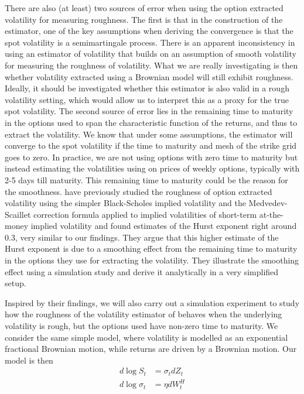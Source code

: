 \documentclass[fleqn,11pt,letterpaper]{article}
\theoremstyle{plain}
\theoremstyle{definition}
\theoremstyle{remark}
\numberwithin{equation}{section}
\begin{document}
There are also (at least) two sources of error when using the option extracted volatility for measuring roughness. The first is that in the construction of the estimator, one of the key assumptions when deriving the convergence is that the spot volatility is a semimartingale process. There is an apparent inconsistency in using an estimator of volatility that builds on an assumption of smooth volatility for measuring the roughness of volatility. What we are really investigating is then whether volatility extracted using a Brownian model will still exhibit roughness. Ideally, it should be investigated whether this estimator is also valid in a rough volatility setting, which would allow us to interpret this as a proxy for the true spot volatility. The second source of error lies in the remaining time to maturity in the options used to span the characteristic function of the returns, and thus to extract the volatility. We know that under some assumptions, the estimator will converge to the spot volatility if the time to maturity and mesh of the strike grid goes to zero. In practice, we are not using options with zero time to maturity but instead estimating the volatilities using on prices of weekly options, typically with 2-5 days till maturity. This remaining time to maturity could be the reason for the smoothness. \cite{LivieriEtAl2018} have previously studied the roughness of option extracted volatility using the simpler Black-Scholes implied volatility and the Medvedev-Scaillet correction formula applied to implied volatilities of short-term at-the-money implied volatility \citep{Medvedev2011} and found estimates of the Hurst exponent right around $0.3$, very similar to our findings. They argue that this higher estimate of the Hurst exponent is due to a smoothing effect from the remaining time to maturity in the options they use for extracting the volatility. They illustrate the smoothing effect using a simulation study and derive it analytically in a very simplified setup. 

Inspired by their findings, we will also carry out a simulation experiment to study how the roughness of the volatility estimator of \cite{Todorov2019} behaves when the underlying volatility is rough, but the options used have non-zero time to maturity. We consider the same simple model, where volatility is modelled as an exponential fractional Brownian motion, while returns are driven by a Brownian motion. Our model is then
\begin{equation}
\begin{split}
    d\log S_t &= \sigma_tdZ_t \\
    d\log\sigma_t&=\eta dW^H_t
\end{split}
\end{equation}
\end{document}
